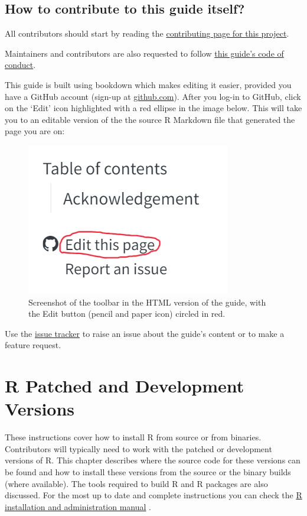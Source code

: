 \documentclass[
]{book}
\begin{document}
\section{How to contribute to this guide itself?}\label{how-to-contribute-to-this-guide}

All contributors should start by reading the \href{https://github.com/r-devel/rdevguide/blob/main/CONTRIBUTING.md}{contributing page for this project}.

Maintainers and contributors are also requested to follow \href{https://github.com/r-devel/rdevguide/blob/main/CONDUCT.md}{this guide's code of conduct}.

This guide is built using bookdown which makes editing it easier, provided you have a GitHub account (sign-up at \href{https://github.com/}{github.com}). After you log-in to GitHub, click on the `Edit' icon highlighted with a red ellipse in the image below. This will take you to an editable version of the the source R Markdown file that generated the page you are on:

\begin{figure}
\centering
\includegraphics{img/edit_icon.png}
\caption{Screenshot of the toolbar in the HTML version of the guide, with the Edit button (pencil and paper icon) circled in red.}
\end{figure}

Use the \href{https://github.com/r-devel/rdevguide/issues}{issue tracker} to raise an issue about the guide's content or to make a feature request.

\chapter{R Patched and Development Versions}\label{GetStart}

These instructions cover how to install R from source or from binaries.
Contributors will typically need to work with the patched or development versions of R.
This chapter describes where the source code for these versions can be found and how to install these versions from the source or the binary builds (where available).
The tools required to build R and R packages are also discussed.
For the most up to date and complete instructions you can check the \href{https://cran.r-project.org/doc/manuals/r-devel/R-admin.html}{R installation and administration manual} .
\end{document}
